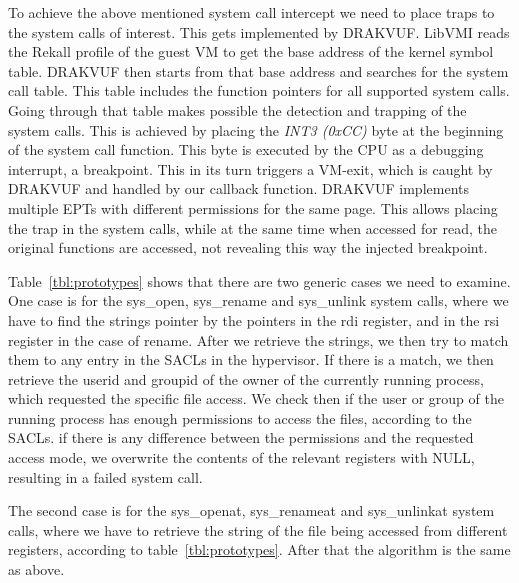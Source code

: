 To achieve the above mentioned system call intercept we need to place traps to the system calls of interest. This gets implemented by DRAKVUF. LibVMI reads the Rekall profile of the guest \ac{VM} to get the base address of the kernel symbol table. DRAKVUF then starts from that base address and searches for the system call table. This table includes the function pointers for all supported system calls. Going through that table makes possible the detection and trapping of the system calls. This is achieved by placing the \textit{INT3 (0xCC)} byte at the beginning of the system call function. This byte is executed by the \ac{CPU} as a debugging interrupt, a breakpoint. This in its turn triggers a VM-exit, which is caught by DRAKVUF and handled by our callback function. DRAKVUF implements multiple \ac{EPT}s with different permissions for the same page. This allows placing the trap in the system calls, while at the same time when accessed for read, the original functions are accessed, not revealing this way the injected breakpoint.

\par Table~\ref{tbl:prototypes} shows that there are two generic cases we need to examine. One case is for the sys\_open, sys\_rename and sys\_unlink system calls, where we have to find the strings pointer by the pointers in the rdi register, and in the rsi register in the case of rename. After we retrieve the strings, we then try to match them to any entry in the \ac{SACL}s in the hypervisor. If there is a match, we then retrieve the userid and groupid of the owner of the currently running process, which requested the specific file access. We check then if the user or group of the running process has enough permissions to access the files, according to the \ac{SACL}s. if there is any difference between the permissions and the requested access mode, we overwrite the contents of the relevant registers with NULL, resulting in a failed system call.

\par The second case is for the sys\_openat, sys\_renameat and sys\_unlinkat system calls, where we have to retrieve the string of the file being accessed from different registers, according to table~\ref{tbl:prototypes}. After that the algorithm is the same as above.


